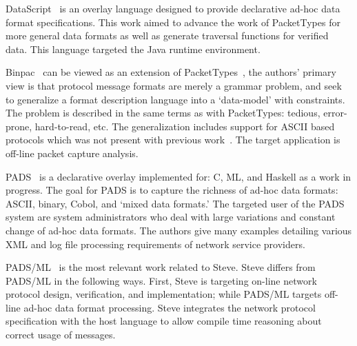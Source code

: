 DataScript~\cite{datascript} is an overlay language designed to provide
declarative ad-hoc data format specifications. This work aimed to advance the
work of PacketTypes for more general data formats as well as generate
traversal functions for verified data. This language targeted the Java
runtime environment.

Binpac~\cite{binpac} can be viewed as an extension of
PacketTypes~\cite{packet_types}, the authors' primary view is that
protocol message formats are merely a grammar problem, and seek
to generalize a format description language into a `data-model' with
constraints. The problem is described in the same terms as with PacketTypes:
tedious, error-prone, hard-to-read, etc. The generalization includes support for
ASCII based protocols which was not present with previous
work~\cite{packet_types}. The target application is off-line packet capture
analysis.

PADS~\cite{pads_orig} is a declarative overlay implemented for: C, ML, and
Haskell as a work in progress. The goal for PADS is to capture the richness
of ad-hoc data formats: ASCII, binary, Cobol, and `mixed data formats.' The
targeted user of the PADS system are system administrators who deal with large
variations and constant change of ad-hoc data formats. The authors give many
examples detailing various XML and log file processing requirements of network
service providers.

PADS/ML~\cite{pads_ml} is the most relevant work related to Steve. Steve 
differs from PADS/ML in the following ways. First, Steve is targeting on-line
network protocol design, verification, and implementation; while PADS/ML
targets off-line ad-hoc data format processing. Steve integrates the network
protocol specification with the host language to allow compile time reasoning
about correct usage of messages.

